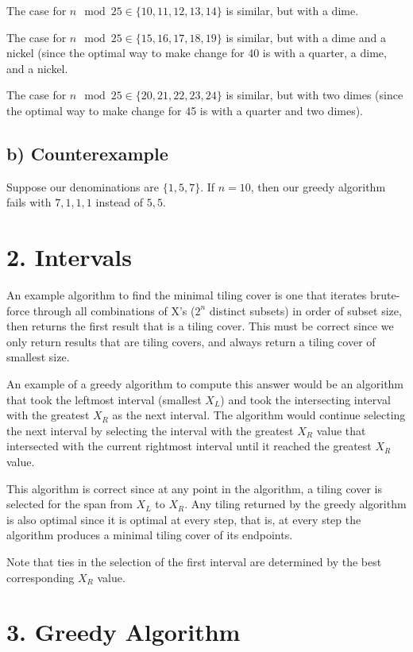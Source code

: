 \documentclass{article}
\begin{document}
The case for $n \mod 25 \in \{10, 11, 12, 13, 14\}$ is similar, but with a
dime.

The case for $n \mod 25 \in \{15, 16, 17, 18, 19\}$ is similar, but with a
dime and a nickel (since the optimal way to make change for 40 is with a
quarter, a dime, and a nickel.

The case for $n \mod 25 \in \{20, 21, 22, 23, 24\}$ is similar, but with two
dimes (since the optimal way to make change for 45 is with a quarter and two
dimes).

\subsection*{b) Counterexample}
Suppose our denominations are $\{1, 5, 7\}$. If $n = 10$, then our greedy
algorithm fails with $7, 1, 1, 1$ instead of $5, 5$.


\section*{2. Intervals}
An example algorithm to find the minimal tiling cover is one that iterates
brute-force through all combinations of X's ($2^n$ distinct subsets) in order
of subset size, then returns the first result that is a tiling cover. This
must be correct since we only return results that are tiling covers, and
always return a tiling cover of smallest size.

An example of a greedy algorithm to compute this answer would be an algorithm
that took the leftmost interval (smallest $X_L$) and took the intersecting
interval with the greatest $X_R$ as the next interval. The algorithm would
continue selecting the next interval by selecting the interval with the
greatest $X_R$ value that intersected with the current rightmost interval
until it reached the greatest $X_R$ value.

This algorithm is correct since at any point in the algorithm, a tiling cover
is selected for the span from $X_L$ to $X_R$. Any tiling returned by the
greedy algorithm is also optimal since it is optimal at every step, that is,
at every step the algorithm produces a minimal tiling cover of its endpoints.

Note that ties in the selection of the first interval are determined by the
best corresponding $X_R$ value.

\section*{3. Greedy Algorithm}
\end{document}
